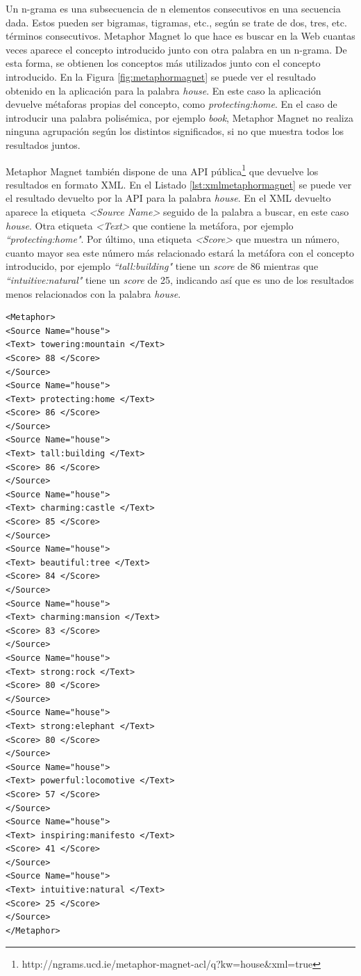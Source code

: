 Un n-grama \citep{ngrama1999} es una subsecuencia de n elementos consecutivos en una secuencia dada. Estos pueden ser bigramas, tigramas, etc., según se trate de dos, tres, etc. términos consecutivos. Metaphor Magnet lo que hace es buscar en la Web cuantas veces aparece el concepto introducido junto con otra palabra en un n-grama. De esta forma, se obtienen los conceptos más utilizados junto con el concepto introducido. En la Figura \ref{fig:metaphormagnet} se puede ver el resultado obtenido en la aplicación para la palabra \textit{house}. En este caso la aplicación devuelve métaforas propias del concepto, como \textit{protecting:home}.
En el caso de introducir una palabra polisémica, por ejemplo \textit{book}, Metaphor Magnet no realiza ninguna agrupación según los distintos significados, si no que muestra todos los resultados juntos.


Metaphor Magnet también dispone de una API pública\footnote{http://ngrams.ucd.ie/metaphor-magnet-acl/q?kw=house\&xml=true} que devuelve los resultados en formato XML. En el Listado \ref{lst:xmlmetaphormagnet} se puede ver el resultado devuelto por la API para la palabra \textit{house}. En el XML devuelto aparece la etiqueta \textit{<Source Name>} seguido de la palabra a buscar, en este caso \textit{house}. Otra etiqueta  \textit{<Text>} que contiene la metáfora, por ejemplo \textit{``protecting:home"}. Por último, una etiqueta \textit{<Score>} que muestra un número, cuanto mayor sea este número más relacionado estará la metáfora con el concepto introducido, por ejemplo \textit{``tall:building"}  tiene un \textit{score} de 86 mientras que \textit{``intuitive:natural"} tiene un \textit{score} de 25, indicando así que es uno de los resultados menos relacionados con la palabra \textit{house}. 



\lstset{language=XML}
\begin{lstlisting}[caption= XML devuelto por Metaphor Magnet para la palabra \textit{house}, label={lst:xmlmetaphormagnet}, frame=single]
<Metaphor>
<Source Name="house">
<Text> towering:mountain </Text>
<Score> 88 </Score>
</Source>
<Source Name="house">
<Text> protecting:home </Text>
<Score> 86 </Score>
</Source>
<Source Name="house">
<Text> tall:building </Text>
<Score> 86 </Score>
</Source>
<Source Name="house">
<Text> charming:castle </Text>
<Score> 85 </Score>
</Source>
<Source Name="house">
<Text> beautiful:tree </Text>
<Score> 84 </Score>
</Source>
<Source Name="house">
<Text> charming:mansion </Text>
<Score> 83 </Score>
</Source>
<Source Name="house">
<Text> strong:rock </Text>
<Score> 80 </Score>
</Source>
<Source Name="house">
<Text> strong:elephant </Text>
<Score> 80 </Score>
</Source>
<Source Name="house">
<Text> powerful:locomotive </Text>
<Score> 57 </Score>
</Source>
<Source Name="house">
<Text> inspiring:manifesto </Text>
<Score> 41 </Score>
</Source>
<Source Name="house">
<Text> intuitive:natural </Text>
<Score> 25 </Score>
</Source>
</Metaphor>
\end{lstlisting}

